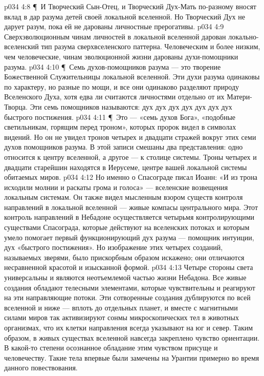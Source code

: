 \vs p034 4:8 \P\ И Творческий Сын\hyp{}Отец, и Творческий Дух\hyp{}Мать по\hyp{}разному вносят вклад в дар разума детей своей локальной вселенной. Но Творческий Дух не дарует разум, пока ей не дарованы личностные прерогативы.
\vs p034 4:9 Сверхэволюционным чинам личностей в локальной вселенной дарован локально\hyp{}вселенский тип разума сверхвселенского паттерна. Человеческим и более низким, чем человеческие, чинам эволюционной жизни дарованы духи\hyp{}помощники разума.
\vs p034 4:10 \P\ Семь духов\hyp{}помощников разума --- это творение Божественной Служительницы локальной вселенной. Эти духи разума одинаковы по характеру, но разные по мощи, и все они одинаково разделяют природу Вселенского Духа, хотя едва ли считаются личностями отдельно от их Матери\hyp{}Творца. Эти семь помощников называются: дух  дух  дух  дух  дух  дух  дух  быстрого постижения.
\vs p034 4:11 \P\ Это --- «семь духов Бога», «подобные светильникам, горящим перед троном», которых пророк видел в символах видений. Но он не увидел тронов четырех и двадцати стражей вокруг этих семи духов помощников разума. В этой записи смешаны два представления: одно относится к центру вселенной, а другое --- к столице системы. Троны четырех и двадцати старейшин находятся в Иерусеме, центре вашей локальной системы обитаемых миров.
\vs p034 4:12 Но именно о Спасограде писал Иоанн: «И из трона исходили молнии и раскаты грома и голоса» --- вселенские возвещения локальным системам. Он также видел мысленным взором существ контроля направлений в локальной вселенной --- живые компасы центрального мира. Этот контроль направлений в Небадоне осуществляется четырьмя контролирующими существами Спасограда, которые действуют на вселенских потоках и которым умело помогает первый функционирующий дух разума --- помощник интуиции, дух «быстрого постижения». Но изображение этих четырех созданий, называемых зверями, было прискорбным образом искажено; они отличаются несравненной красотой и изысканной формой.
\vs p034 4:13 Четыре стороны света универсальны и являются неотъемлемой частью жизни Небадона. Все живые создания обладают телесными элементами, которые чувствительны и реагируют на эти направляющие потоки. Эти сотворенные создания дублируются по всей вселенной и ниже --- вплоть до отдельных планет, и вместе с магнитными силами миров так активизируют сонмы микроскопических тел в животных организмах, что их клетки направления всегда указывают на юг и север. Таким образом, в живых существах вселенной навсегда закреплено чувство ориентации. В какой\hyp{}то степени осознанное обладание этим чувством присуще и человечеству. Такие тела впервые были замечены на Урантии примерно во время данного повествования.

